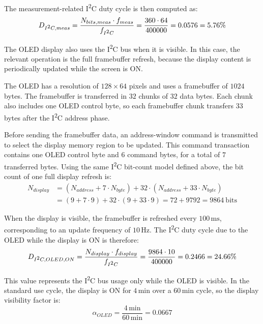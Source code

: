 The measurement-related I\textsuperscript{2}C duty cycle is then computed as:
\begin{equation}
	D_{I\textsuperscript{2}C,meas}	= \frac{N_{bits,meas} \cdot f_{meas}}{f_{I\textsuperscript{2}C}}
	= \frac{360 \cdot 64}{400000} = 0.0576 = 5.76\%
\end{equation}

The OLED display also uses the I\textsuperscript{2}C bus when it is visible. 
In this case, the relevant operation is the full framebuffer refresh, because the display content is periodically updated while the screen is ON.

The OLED has a resolution of \(128 \times 64\) pixels and uses a framebuffer of \(1024\) bytes. 
The framebuffer is transferred in \(32\) chunks of \(32\) data bytes. 
Each chunk also includes one OLED control byte, so each framebuffer chunk transfers \(33\) bytes after the I\textsuperscript{2}C address phase.

Before sending the framebuffer data, an address-window command is transmitted to select the display memory region to be updated. 
This command transaction contains one OLED control byte and \(6\) command bytes, for a total of \(7\) transferred bytes. 
Using the same I\textsuperscript{2}C bit-count model defined above, the bit count of one full display refresh is:
\begin{equation}
	\begin{aligned}
		N_{display}
		& = \left(N_{address} + 7 \cdot N_{byte}\right) + 32 \cdot \left(N_{address} + 33 \cdot N_{byte}\right) \\ 
		& = \left(9 + 7 \cdot 9\right) + 32 \cdot \left(9 + 33 \cdot 9\right) = 72 + 9792 = 9864 \ \mathrm{bits}
	\end{aligned}
\end{equation}

When the display is visible, the framebuffer is refreshed every \(100\,\mathrm{ms}\), corresponding to an update frequency of \(10\,\mathrm{Hz}\). 
The I\textsuperscript{2}C duty cycle due to the OLED while the display is ON is therefore:
\begin{equation}
	D_{I\textsuperscript{2}C,OLED,ON}	= \frac{N_{display} \cdot f_{display}}{f_{I\textsuperscript{2}C}} 
	= \frac{9864 \cdot 10}{400000} 
	= 0.2466 
	= 24.66\%
\end{equation}

This value represents the I\textsuperscript{2}C bus usage only while the OLED is visible. 
In the standard use cycle, the display is ON for \(4\,\mathrm{min}\) over a \(60\,\mathrm{min}\) cycle, so the display visibility factor is:
\begin{equation}
	\alpha_{OLED}	= \frac{4\,\mathrm{min}}{60\,\mathrm{min}}
	= 0.0667
\end{equation}

